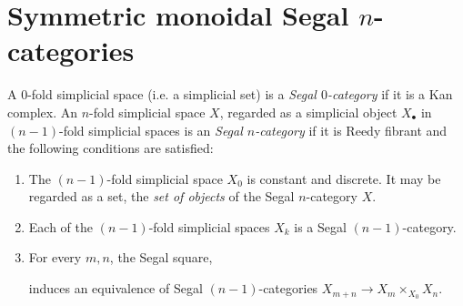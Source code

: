 \documentclass{amsart}
\begin{document}
\section{Symmetric monoidal Segal $n$-categories} \label{sec-symmoninftyNcat}

\begin{definition}
	A $0$-fold simplicial space (i.e. a simplicial set) is a {\em  Segal $0$-category} if it is a Kan complex. An $n$-fold simplicial space $X$, regarded as a simplicial object $X_\bullet$ in $(n-1)$-fold simplicial spaces is an {\em Segal $n$-category} if it is Reedy fibrant and the following conditions are satisfied:
		\begin{enumerate}
			\item The $(n-1)$-fold simplicial space $X_0$ is constant and discrete. It may be regarded as a set, the {\em set of objects} of the Segal $n$-category $X$. 
			\item Each of the $(n-1)$-fold simplicial spaces $X_k$ is a  Segal $(n-1)$-category.
			\item For every $m, n$, the Segal square,
			\begin{center}
			\end{center}
			induces an equivalence of  Segal $(n-1)$-categories $X_{m+n} \to X_m \times_{X_0} X_n$.  
				\end{enumerate}
\end{definition}
\end{document}
